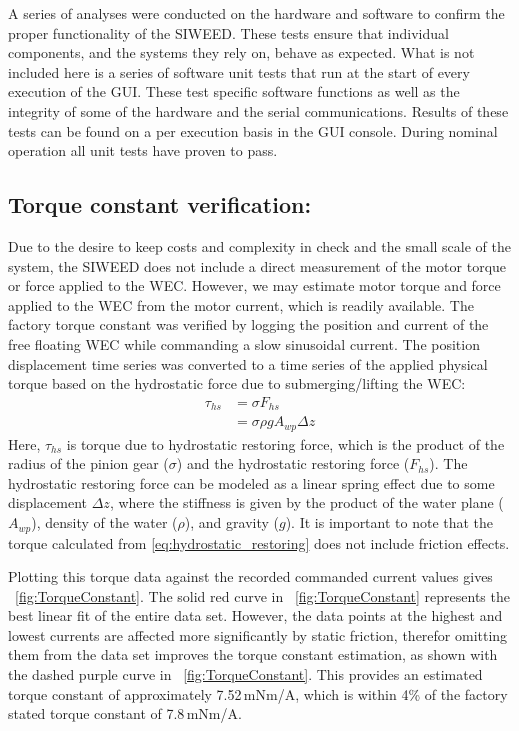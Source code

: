 \documentclass[hardware,article,submit,pdftex,moreauthors]{Definitions/mdpi}
\begin{document}
A series of analyses were conducted on the hardware and software to confirm the proper functionality of the SIWEED.
These tests ensure that individual components, and the systems they rely on, behave as expected.
What is not included here is a series of software unit tests that run at the start of every execution of the GUI.
These test specific software functions as well as the integrity of some of the hardware and the serial communications. 
Results of these tests can be found on a per execution basis in the GUI console.
During nominal operation all unit tests have proven to pass.

\subsection{Torque constant verification:}\label{tConstSec}
Due to the desire to keep costs and complexity in check and the small scale of the system, the SIWEED does not include a direct measurement of the motor torque or force applied to the WEC.
However, we may estimate motor torque and force applied to the WEC from the motor current, which is readily available.
The factory torque constant was verified by logging the position and current of the free floating WEC while commanding a slow sinusoidal current.
The position displacement time series was converted to a time series of the applied physical torque based on the hydrostatic force due to submerging/lifting the WEC:
%
\begin{equation}
\begin{aligned}
\tau_{hs} 
&= \sigma F_{hs} \\
&= \sigma \rho g A_{wp} \Delta z
\end{aligned}
\label{eq:hydrostatic_restoring}
\end{equation}
%
Here, $\tau_{hs}$ is torque due to hydrostatic restoring force, which is the product of the radius of the pinion gear ($\sigma$) and the hydrostatic restoring force ($F_{hs}$).
The hydrostatic restoring force can be modeled as a linear spring effect due to some displacement $\Delta z$, where the stiffness is given by the product of the water plane ($A_{wp}$), density of the water ($\rho$), and gravity ($g$).
It is important to note that the torque calculated from \eqref{eq:hydrostatic_restoring} does not include friction effects.

Plotting this torque data against the recorded commanded current values gives  \figurename~\ref{fig:TorqueConstant}.
The solid red curve in \figurename~\ref{fig:TorqueConstant} represents the best linear fit of the entire data set.
However, the data points at the highest and lowest currents are affected more significantly by static friction, therefor omitting them from the data set improves the torque constant estimation, as shown with the dashed purple curve in \figurename~\ref{fig:TorqueConstant}.
This provides an estimated torque constant of approximately 7.52\,mNm/A, which is within 4\% of the factory stated torque constant of 7.8\,mNm/A.
\end{document}
